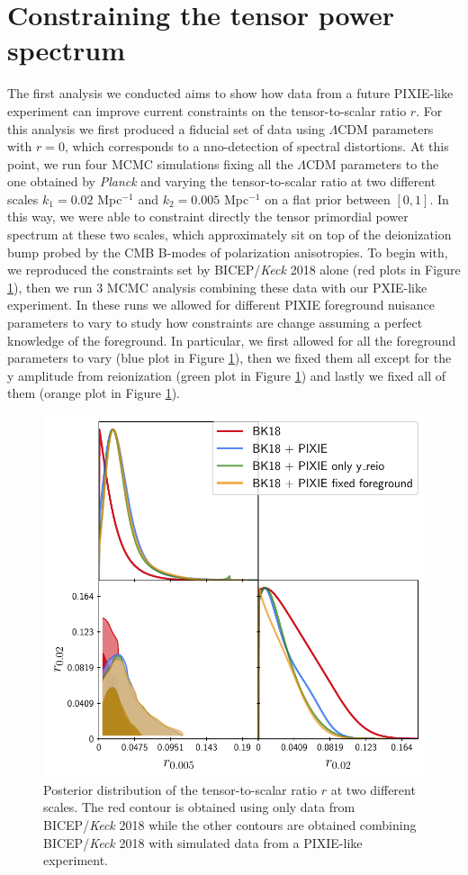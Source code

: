 \section{Constraining the tensor power spectrum}
The first analysis we conducted aims to show how data from a future PIXIE-like experiment can improve current constraints on the tensor-to-scalar ratio $r$. For this analysis we first produced a fiducial set of data using $\Lambda$CDM parameters with $r=0$, which corresponds to a nno-detection of spectral distortions. At this point, we run four MCMC simulations fixing all the $\Lambda$CDM parameters to the one obtained by \emph{Planck}\cite{planck2018results} and varying the tensor-to-scalar ratio at two different scales $k_1=0.02$ Mpc$^{-1}$ and $k_2=0.005$ Mpc$^{-1}$ on a flat prior between $[0,1]$. In this way, we were able to constraint directly the tensor primordial power spectrum at these two scales, which approximately sit on top of the deionization bump probed by the CMB B-modes of polarization anisotropies. To begin with, we reproduced the constraints set by BICEP/\textit{Keck} 2018 alone (red plots in Figure \ref{fig:r_const}), then we run 3 MCMC analysis combining these data with our PXIE-like experiment. In these runs we allowed for different PIXIE foreground nuisance parameters to vary to study how constraints are change assuming a perfect knowledge of the foreground. In particular, we first allowed for all the foreground parameters to vary (blue plot in Figure \ref{fig:r_const}), then we fixed them all except for the y amplitude from reionization (green plot in Figure \ref{fig:r_const}) and lastly we fixed all of them (orange plot in Figure \ref{fig:r_const}). 
\begin{figure}[t]
        \centering
        \includegraphics[width=.75\textwidth]{Constraints/BKPIXIE.pdf}
        \caption{Posterior distribution of the tensor-to-scalar ratio $r$ at two different scales. The red contour is obtained using only data from BICEP/\textit{Keck} 2018 \cite{Ade_2021} while the other contours are obtained combining BICEP/\textit{Keck} 2018 with simulated data from a PIXIE-like experiment.}
        \label{fig:r_const}        
    \end{figure}

